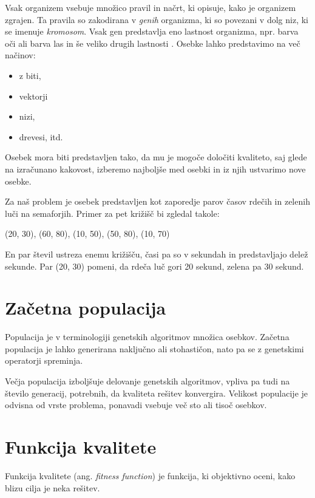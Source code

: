 \documentclass[a4paper, 12pt]{book}
\begin{document}
Vsak organizem vsebuje mno\v zico pravil in na\v crt, ki opisuje, kako je organizem zgrajen. Ta pravila so zakodirana v \textit{genih} organizma, ki so povezani v dolg niz, ki se imenuje \textit{kromosom}. Vsak gen predstavlja eno lastnost organizma, npr. barva o\v ci ali barva las in \v se veliko drugih lastnosti
\cite{aijunkie}. Osebke lahko predstavimo na ve\v c na\v cinov:

\begin{itemize} \itemsep0em
\item z biti,
\item vektorji
\item nizi,
\item drevesi, itd.
\end{itemize}

Osebek mora biti predstavljen tako, da mu je mogo\v ce dolo\v citi kvaliteto, saj glede na izra\v cunano kakovost, izberemo najbolj\v se med osebki in iz njih ustvarimo nove osebke.

Za na\v s problem je osebek predstavljen kot zaporedje parov \v casov rde\v cih in zelenih lu\v ci na semaforjih. Primer za pet kri\v zi\v s\v c bi zgledal takole:
\begin{center}
(20, 30), (60, 80), (10, 50), (50, 80), (10, 70)
\end{center}

En par \v stevil ustreza enemu kri\v zi\v s\v cu, \v casi pa so v sekundah in predstavljajo dele\v z sekunde. Par (20, 30) pomeni, da rde\v ca lu\v c gori 20 sekund, zelena pa 30 sekund.

\section{Za\v cetna populacija}
Populacija je v terminologiji genetskih algoritmov mno\v zica osebkov. Za\v cetna populacija je lahko generirana naklju\v cno ali stohasti\v con, nato pa se z genetskimi operatorji spreminja.

Ve\v cja populacija izbolj\v suje delovanje genetskih algoritmov, vpliva pa tudi na \v stevilo generacij, potrebnih, da kvaliteta re\v sitev konvergira. Velikost populacije je odvisna od vrste problema, ponavadi vsebuje ve\v c sto ali tiso\v c osebkov.

\section{Funkcija kvalitete}
Funkcija kvalitete (ang. \textit{fitness function}) je funkcija, ki objektivno oceni, kako blizu cilja je neka re\v sitev.
\end{document}
